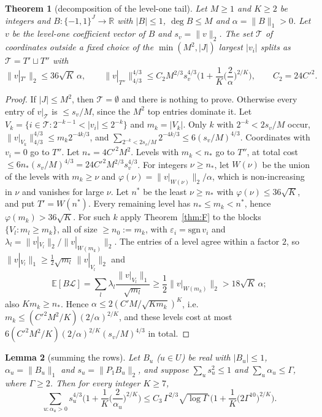 \documentclass[11pt]{amsart}
\newtheorem{theorem}{Theorem}[section]
\newtheorem{lemma}[theorem]{Lemma}
\theoremstyle{definition}
\newcommand{\R}{\mathbb{R}}
\newcommand{\E}{\mathbb{E}}
\begin{document}
\begin{theorem}[decomposition of the level-one tail]\label{thm:S}
Let $M\ge1$ and $K\ge2$ be integers and $B:\{-1,1\}^J\to\R$ with $|B|\le1$, $\deg B\le M$ and $\alpha=\|B\|_1>0$. Let $v$ be the level-one coefficient vector of $B$ and $s_v=\|v\|_2$. The set $\mathcal T$ of coordinates outside a fixed choice of the $\min(M^2,|J|)$ largest $|v_i|$ splits as $\mathcal T=T'\sqcup T''$ with
\[
\|v|_{T'}\|_2\le36\sqrt K\,\alpha,\qquad \|v|_{T''}\|_{4/3}^{4/3}\le C_2M^{2/3}s_v^{4/3}\Big(1+\frac1K\Big(\frac2\alpha\Big)^{2/K}\Big),\qquad C_2=24C'^2 .
\]
\end{theorem}

\begin{proof}
If $|J|\le M^2$, then $\mathcal T=\emptyset$ and there is nothing to prove. Otherwise every entry of $v|_{\mathcal T}$ is $\le s_v/M$, since the $M^2$ top entries dominate it. Let $V_k=\{i\in\mathcal T:2^{-k-1}<|v_i|\le2^{-k}\}$ and $m_k=|V_k|$. Only $k$ with $2^{-k}<2s_v/M$ occur, $\|v|_{V_k}\|_{4/3}^{4/3}\le m_k2^{-4k/3}$, and $\sum_{2^{-k}<2s_v/M}2^{-4k/3}\le6(s_v/M)^{4/3}$. Coordinates with $v_i=0$ go to $T''$. Let $n_*=4C'^2M^2$. Levels with $m_k<n_*$ go to $T''$, at total cost $\le6n_*(s_v/M)^{4/3}=24C'^2M^{2/3}s_v^{4/3}$. For integers $\nu\ge n_*$, let $W(\nu)$ be the union of the levels with $m_k\ge\nu$ and $\varphi(\nu)=\|v|_{W(\nu)}\|_2/\alpha$, which is non-increasing in $\nu$ and vanishes for large $\nu$. Let $n^*$ be the least $\nu\ge n_*$ with $\varphi(\nu)\le36\sqrt K$, and put $T'=W(n^*)$. Every remaining level has $n_*\le m_k<n^*$, hence $\varphi(m_k)>36\sqrt K$. For such $k$ apply Theorem~\ref{thm:F} to the blocks $\{V_l:m_l\ge m_k\}$, all of size $\ge n_0:=m_k$, with $\varepsilon_i=\mathrm{sgn}\,v_i$ and $\lambda_l=\|v|_{V_l}\|_2/\|v|_{W(m_k)}\|_2$. The entries of a level agree within a factor $2$, so $\|v|_{V_l}\|_1\ge\frac12\sqrt{m_l}\,\|v|_{V_l}\|_2$ and
\[
\E[B\mathcal L]=\sum_l\lambda_l\frac{\|v|_{V_l}\|_1}{\sqrt{m_l}}\ge\frac12\|v|_{W(m_k)}\|_2>18\sqrt K\,\alpha ;
\]
also $Km_k\ge n_*$. Hence $\alpha\le2(C'M/\sqrt{Km_k})^K$, i.e.\ $m_k\le(C'^2M^2/K)(2/\alpha)^{2/K}$, and these levels cost at most $6(C'^2M^2/K)(2/\alpha)^{2/K}(s_v/M)^{4/3}$ in total.
\end{proof}

\begin{lemma}[summing the rows]\label{lem:Q}
Let $B_u$ ($u\in U$) be real with $|B_u|\le1$, $\alpha_u=\|B_u\|_1$ and $s_u=\|P_1B_u\|_2$, and suppose $\sum_us_u^2\le1$ and $\sum_u\alpha_u\le \Gamma$, where $\Gamma\ge2$. Then for every integer $K\ge7$,
\[
\sum_{u:\alpha_u>0}s_u^{4/3}\Big(1+\frac1K\Big(\frac2{\alpha_u}\Big)^{2/K}\Big)\le C_3\,\Gamma^{2/3}\sqrt{\log \Gamma}\,\Big(1+\frac1K\big(2\Gamma^{10}\big)^{2/K}\Big).
\]
\end{lemma}
\end{document}
